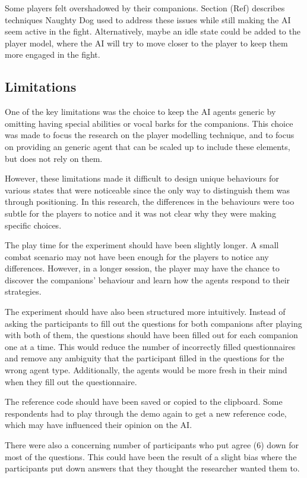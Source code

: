 \documentclass{IEEEtran}
\begin{document}
Some players felt overshadowed by their companions. Section (Ref) describes techniques Naughty Dog used to address these issues while still making the AI seem active in the fight. Alternatively, maybe an idle state could be added to the player model, where the AI will try to move closer to the player to keep them more engaged in the fight.

\subsection{Limitations}
\label{Limitations}

One of the key limitations was the choice to keep the AI agents generic by omitting having special abilities or vocal barks for the companions. This choice was made to focus the research on the player modelling technique, and to focus on providing an generic agent that can be scaled up to include these elements, but does not rely on them.

However, these limitations made it difficult to design unique behaviours for various states that were noticeable since the only way to distinguish them was through positioning. In this research, the differences in the behaviours were too subtle for the players to notice and it was not clear why they were making specific choices.

The play time for the experiment should have been slightly longer. A small combat scenario may not have been enough for the players to notice any differences. However, in a longer session, the player may have the chance to discover the companions’ behaviour and learn how the agents respond to their strategies.

The experiment should have also been structured more intuitively. Instead of asking the participants to fill out the questions for both companions after playing with both of them, the questions should have been filled out for each companion one at a time. This would reduce the number of incorrectly filled questionnaires and remove any ambiguity that the participant filled in the questions for the wrong agent type. Additionally, the agents would be more fresh in their mind when they fill out the questionnaire.

The reference code should have been saved or copied to the clipboard. Some respondents had to play through the demo again to get a new reference code, which may have influenced their opinion on the AI.

There were also a concerning number of participants who put agree (6) down for most of the questions. This could have been the result of a slight bias where the participants put down answers that they thought the researcher wanted them to.
\end{document}
